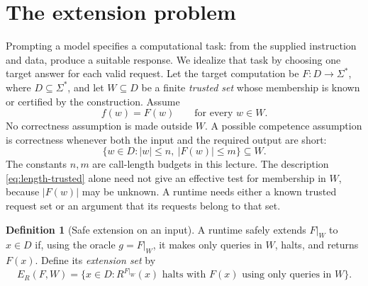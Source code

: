 \documentclass[11pt,twoside]{article}
\theoremstyle{definition}
\newtheorem{definition}[theorem]{Definition}
\theoremstyle{remark}
\begin{document}
\section{The extension problem}
\label{sec:extension}

Prompting a model specifies a computational task: from the supplied
instruction and data, produce a suitable response. We idealize that task
by choosing one target answer for each valid request.
Let the target computation be
$F:D\to\Sigma^*$, where $D\subseteq\Sigma^*$, and let $W\subseteq D$
be a finite \emph{trusted set} whose membership is known or certified by
the construction. Assume
\begin{equation}
 f(w)=F(w)\qquad\text{for every }w\in W.
 \label{eq:trusted}
\end{equation}
No correctness assumption is made outside $W$. A possible competence
assumption is correctness whenever both the input and the required output
are short:
\begin{equation}
 \{w\in D:|w|\leq n,\ |F(w)|\leq m\}\subseteq W.
 \label{eq:length-trusted}
\end{equation}
The constants $n,m$ are call-length budgets in this lecture. The
description \eqref{eq:length-trusted} alone need not give an effective test
for membership in $W$, because $|F(w)|$ may be unknown. A runtime needs
either a known trusted request set or an argument that its requests belong
to that set.

\begin{definition}[Safe extension on an input]
\label{def:extension}
A runtime safely extends $F|_W$ to $x\in D$ if, using the oracle
$g=F|_W$, it makes only queries in $W$, halts, and returns $F(x)$.
Define its \emph{extension set} by
\begin{equation}
 E_R(F,W)=\{x\in D:R^{F|_W}(x)\text{ halts with }F(x)
                   \text{ using only queries in }W\}.
 \label{eq:extension-set}
\end{equation}
\end{definition}
\end{document}
